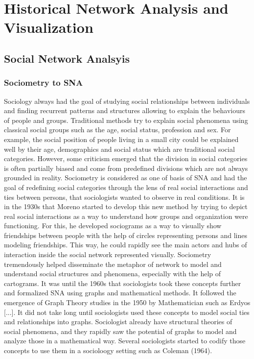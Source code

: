 
\chapter{Historical Network Analysis and Visualization}



\section{Social Network Analsyis}


\subsection{Sociometry to SNA}

Sociology always had the goal of studying social relationships between individuals and finding recurrent patterns and structures allowing to explain the behaviours of people and groups.
Traditional methods try to explain social phenomena using classical social groups such as the age, social status, profession and sex.
For example, the social position of people living in a small city could be explained well by their age, demographics and social status which are traditional social categories.
However, some criticism emerged that the division in social categories is often partially biased and come from predefined divisions which are not always grounded in reality.
Sociometry is considered as one of basis of SNA and had the goal of redefining social categories through the lens of real social interactions and ties between persons, that sociologists wanted to observe in real conditions.
It is in the 1930s that Moreno started to develop this new method by trying to depict real social interactions as a way to understand how groups and organization were functioning.
For this, he developed sociograms as a way to visually show friendships between people with the help of circles representing persons and lines modeling friendships.
This way, he could rapidly see the main actors and hubs of interaction inside the social network represented visually.
Sociometry tremendously helped disseminate the metaphor of network to model and understand social structures and phenomena, especially with the help of cartograms.
It was until the 1960s that sociologists took these concepts further and formalized SNA using graphs and mathematical methods. It followed the emergence of Graph Theory studies in the 1950 by Mathematician such as Erdyos [...].
It did not take long until sociologists used these concepts to model social ties and relationships into graphs. Sociologist already have structural theories of social phenomena, and they rapidly saw the potential of graphs to model and analyze those in a mathematical way. Several sociologists started to codify those concepts to use them in a socioloogy setting such as Coleman (1964).
